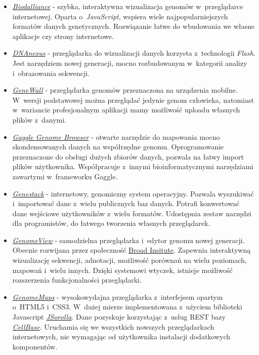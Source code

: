 \documentclass[a4paper,12pt,oneside]{mwrep}  %
\begin{document}
\begin{itemize}
\item \href{http://www.biodalliance.org/}{\emph{Biodalliance}} \label{biodalliance} - szybka, interaktywna wizualizacja genomów w~przeglądarce internetowej. Oparta o~\emph{JavaScript}, wspiera wiele najpopularniejszych formatów danych genetycznych. Rozwiązanie łatwe do wbudowania we własne aplikacje czy strony internetowe.

\item \href{https://www.dnanexus.com/genomes/hg18/public_browse}{\emph{DNAnexus}} \label{dnanexus} - przeglądarka do wizualizacji danych korzysta z~technologii \emph{Flash}. Jest narzędziem nowej generacji, mocno rozbudowanym w~kategorii analizy i~obrazowania sekwencji.

\item \href{http://download.cnet.com/GeneWall-Genome-Browser-Pro/3000-2129_4-75855506.html}{\emph{GeneWall}} \label{genewall} - przeglądarka genomów przeznaczona na urządzenia mobilne. W~wersji podstawowej można przeglądać jedynie genom człowieka, natomiast w~wariancie profesjonalnym aplikacji mamy możliwość uploadu własnych plików z~danymi.

\item \href{http://gaggle.systemsbiology.net/docs/geese/genomebrowser/}{\emph{Gaggle Genome Browser}} \label{gaggle} - otwarte narzędzie do mapowania mocno skondensowanych danych na współrzędne genomu. Oprogramowanie przeznaczone do obsługi dużych zbiorów danych, pozwala na łatwy import plików użytkownika. Współpracuje z~innymi bioinformatycznymi narzędziami zawartymi w~frameworku Gaggle.

\item \href{https://genestack.com/}{\emph{Genestack}} \label{genestack} - internetowy, genomiczny system operacyjny. Pozwala wyszukiwać i~importować dane z~wielu publicznych baz danych. Potrafi konwertować dane wejściowe użytkowników z~wielu formatów. Udostępnia zestaw narzędzi dla programistów, do łatwego tworzenia własnych przeglądarek.

\item \href{http://genomeview.org/}{\emph{GenomeView}} \label{genomeview} - samodzielna przeglądarka i~edytor genomu nowej generacji. Obecnie rozwijana przez społeczność \href{http://www.broadinstitute.org/}{Broad Insitute}. Zapewnia interaktywną wizualizację sekwencji, adnotacji, możliwość porównań na wielu poziomach, mapowań i~wielu innych. Dzięki systemowi wtyczek, istnieje możliwość rozszerzenia funkcjonalności przeglądarki.

\item \href{http://www.genomemaps.org/}{\emph{GenomeMaps}} \label{genomemaps} - wysokowydajna przeglądarka z~interfejsem opartym o~HTML5 i~CSS3. W~dużej mierze implementowana z~użyciem biblioteki Javascript \href{https://github.com/opencb/jsorolla}{\mbox{\emph{JSorolla}}}. Dane pozyskuje korzystając z~usług REST bazy \href{https://github.com/opencb/cellbase/wiki}{\emph{CellBase}}. Uruchamia się we wszystkich nowszych przeglądarkach internetowych, nie wymagając od użytkownika instalacji dodatkowych komponentów.


\end{itemize}
\end{document}
